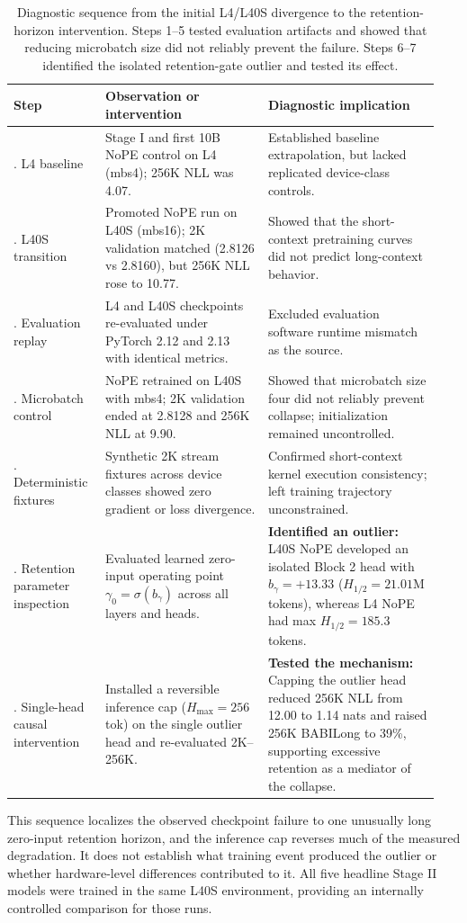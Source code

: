 \begin{table}[!ht]
\centering
\small
\setlength{\tabcolsep}{4pt}
\begin{tabular}{>{\raggedright\arraybackslash}p{0.20\linewidth}>{\raggedright\arraybackslash}p{0.36\linewidth}>{\raggedright\arraybackslash}p{0.38\linewidth}}
\toprule
\textbf{Step} & \textbf{Observation or intervention} & \textbf{Diagnostic implication} \\
\midrule
1. L4 baseline & Stage I and first 10B NoPE control on L4 (mbs4); 256K NLL was 4.07. & Established baseline extrapolation, but lacked replicated device-class controls. \\
2. L40S transition & Promoted NoPE run on L40S (mbs16); 2K validation matched (2.8126 vs 2.8160), but 256K NLL rose to 10.77. & Showed that the short-context pretraining curves did not predict long-context behavior. \\
3. Evaluation replay & L4 and L40S checkpoints re-evaluated under PyTorch 2.12 and 2.13 with identical metrics. & Excluded evaluation software runtime mismatch as the source. \\
4. Microbatch control & NoPE retrained on L40S with mbs4; 2K validation ended at 2.8128 and 256K NLL at 9.90. & Showed that microbatch size four did not reliably prevent collapse; initialization remained uncontrolled. \\
5. Deterministic fixtures & Synthetic 2K stream fixtures across device classes showed zero gradient or loss divergence. & Confirmed short-context kernel execution consistency; left training trajectory unconstrained. \\
6. Retention parameter inspection & Evaluated learned zero-input operating point $\gamma_0 = \sigma(b_\gamma)$ across all layers and heads. & \textbf{Identified an outlier:} L40S NoPE developed an isolated Block 2 head with $b_\gamma = +13.33$ ($H_{1/2} = 21.01$M tokens), whereas L4 NoPE had max $H_{1/2} = 185.3$ tokens. \\
7. Single-head causal intervention & Installed a reversible inference cap ($H_{\max} = 256$ tok) on the single outlier head and re-evaluated 2K--256K. & \textbf{Tested the mechanism:} Capping the outlier head reduced 256K NLL from 12.00 to 1.14 nats and raised 256K BABILong to 39\%, supporting excessive retention as a mediator of the collapse. \\
\bottomrule
\end{tabular}
\caption{Diagnostic sequence from the initial L4/L40S divergence to the retention-horizon intervention. Steps 1--5 tested evaluation artifacts and showed that reducing microbatch size did not reliably prevent the failure. Steps 6--7 identified the isolated retention-gate outlier and tested its effect.}
\label{table:environment_diagnostic_journey}
\end{table}

This sequence localizes the observed checkpoint failure to one unusually long zero-input retention horizon, and the inference cap reverses much of the measured degradation. It does not establish what training event produced the outlier or whether hardware-level differences contributed to it. All five headline Stage II models were trained in the same L40S environment, providing an internally controlled comparison for those runs.
